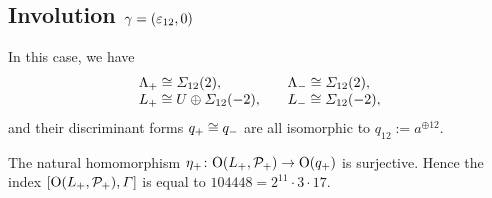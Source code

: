 \documentclass{amsart} %
\begin{document}
\subsection{Involution $\gamma=(\varepsilon_{12}, 0)$}\label{subsec:walls12}
%
%
In this case, we have
\[
\begin{array}{ll}
\Lambda_{+}\cong \varSigma_{12}(2), \quad &\Lambda_{-}\cong \varSigma_{12}(2),\\
L_{+}\cong U\oplus \varSigma_{12}(-2), \quad &L_{-}\cong \varSigma_{12}(-2), 
\end{array}
\]
and their discriminant forms $q_{+}\cong q_{-}$ are all isomorphic to
$q_{12}:=a^{\oplus 12}$.
%
%
%
% 
%
%
\begin{proposition}
The natural homomorphism 
${\eta}_{+}\colon \mathord{\mathrm{O}}(L_{+}, \mathord{\mathcal{P}}_{+}) \to \mathord{\mathrm{O}}(q_{+})$ is surjective.
Hence the index 
$[\mathord{\mathrm{O}}(L_{+}, \mathord{\mathcal{P}}_{+}), \varGamma]$ is equal to 
$104448 ={2}^{11} \cdot {3} \cdot {17}$.
\end{proposition}
%
\end{document}
